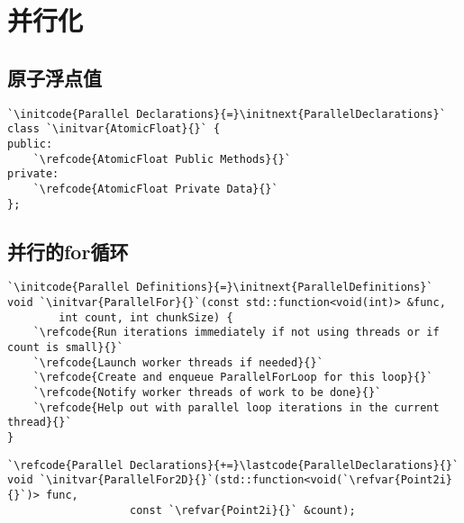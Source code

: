 \section{并行化}\label{sec:并行化}

\subsection{原子浮点值}\label{sub:原子浮点值}
\begin{lstlisting}
`\initcode{Parallel Declarations}{=}\initnext{ParallelDeclarations}`
class `\initvar{AtomicFloat}{}` {
public:
    `\refcode{AtomicFloat Public Methods}{}`
private:
    `\refcode{AtomicFloat Private Data}{}`
};
\end{lstlisting}

\subsection{并行的for循环}\label{sub:并行的for循环}
\begin{lstlisting}
`\initcode{Parallel Definitions}{=}\initnext{ParallelDefinitions}`
void `\initvar{ParallelFor}{}`(const std::function<void(int)> &func,
        int count, int chunkSize) {
    `\refcode{Run iterations immediately if not using threads or if count is small}{}`
    `\refcode{Launch worker threads if needed}{}`
    `\refcode{Create and enqueue ParallelForLoop for this loop}{}`
    `\refcode{Notify worker threads of work to be done}{}`
    `\refcode{Help out with parallel loop iterations in the current thread}{}`
}
\end{lstlisting}

\begin{lstlisting}
`\refcode{Parallel Declarations}{+=}\lastcode{ParallelDeclarations}{}`
void `\initvar{ParallelFor2D}{}`(std::function<void(`\refvar{Point2i}{}`)> func,
                   const `\refvar{Point2i}{}` &count);
\end{lstlisting}